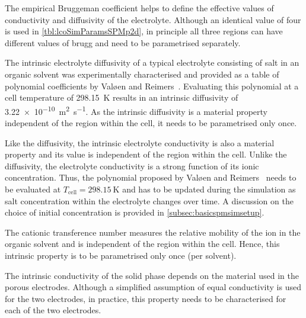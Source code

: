 \begin{enumdescriptnum}[leftmargin=!,itemsep=1ex,labelwidth=\widthof{$\symbf{\text{brugg}_j}\ \scriptstyle (\times 3)$abc}
    ,partopsep=0pt
    ,topsep=0pt
    ]

      The  empirical Bruggeman  coefficient  helps
    to  define  the   effective  values  of  conductivity   and  diffusivity  of
    the   electrolyte.   Although  an   identical   value   of  four   is   used
    in \cref{tbl:lcoSimParamsSPMp2d}, in  principle all  three regions  can have
    different values of brugg and need to be parametrised separately.

      The  intrinsic  electrolyte   diffusivity  of  a  typical
    electrolyte  consisting  of    salt in  an  organic  solvent  was
    experimentally  characterised   and  provided  as  a   table  of  polynomial
    coefficients  by  Valøen  and  Reimers~\cite{Valoen2005}.  Evaluating  this
    polynomial  at a  cell  temperature of  \SI{298.15}{\kelvin}  results in  an
    intrinsic  diffusivity of  \SI{3.22e-10}{\meter\squared\per\second}. As  the
    intrinsic  diffusivity is  a material  property  independent of  the
    region within the cell, it needs to be parametrised only once.

       Like    the   diffusivity,   the
    intrinsic electrolyte conductivity is also a material property and its value
    is independent  of the region within  the cell. Unlike the  diffusivity, the
    electrolyte conductivity  is a strong  function of its  ionic concentration.
    Thus, the polynomial proposed by Valøen and Reimers~\cite{Valoen2005} needs
    to  be evaluated  at  $T_\text{cell}= \SI{298.15}{\kelvin}$  and  has to  be
    updated during the  simulation as salt concentration  within the electrolyte
    changes over time. A discussion on the choice of initial concentration is
    provided in \cref{subsec:basicspmsimsetup}.

      The  cationic transference  number
    measures the relative  mobility of the  ion in  the organic solvent
    and is  independent of  the region  within the  cell. Hence,  this intrinsic
    property is to be parametrised only once (per solvent).

      The  intrinsic conductivity  of
    the  solid phase  depends on  the material  used in  the porous  electrodes.
    Although a simplified  assumption of equal conductivity is used  for the two
    electrodes, in practice, this property needs to be characterised for each of
    the two electrodes.

\end{enumdescriptnum}

